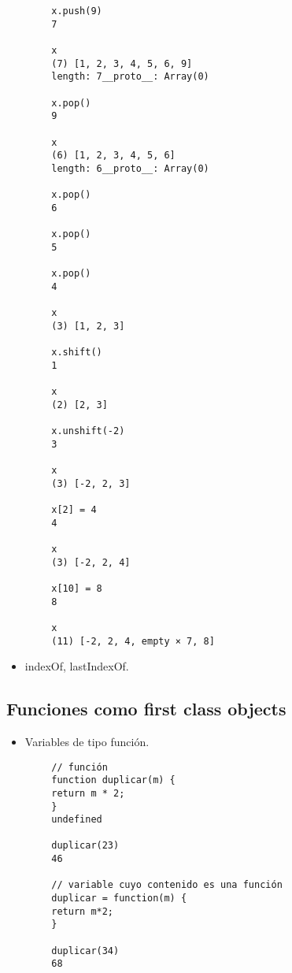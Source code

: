 \begin{verbatim}
        x.push(9)
        7

        x
        (7) [1, 2, 3, 4, 5, 6, 9]
        length: 7__proto__: Array(0)

        x.pop()
        9

        x
        (6) [1, 2, 3, 4, 5, 6]
        length: 6__proto__: Array(0)

        x.pop()
        6

        x.pop()
        5

        x.pop()
        4

        x
        (3) [1, 2, 3]

        x.shift()
        1

        x
        (2) [2, 3]

        x.unshift(-2)
        3

        x
        (3) [-2, 2, 3]

        x[2] = 4
        4

        x
        (3) [-2, 2, 4]

        x[10] = 8
        8

        x
        (11) [-2, 2, 4, empty × 7, 8]
\end{verbatim}

\begin{itemize}
\tightlist
\item
  indexOf, lastIndexOf.
\end{itemize}

\hypertarget{funciones-como-first-class-objects}{%
\subsection{Funciones como first class
objects}\label{funciones-como-first-class-objects}}

\begin{itemize}
\tightlist
\item
  Variables de tipo función.
\end{itemize}

\begin{verbatim}
        // función
        function duplicar(m) {
        return m * 2;
        }
        undefined

        duplicar(23)
        46

        // variable cuyo contenido es una función
        duplicar = function(m) {
        return m*2;
        }

        duplicar(34)
        68
\end{verbatim}

